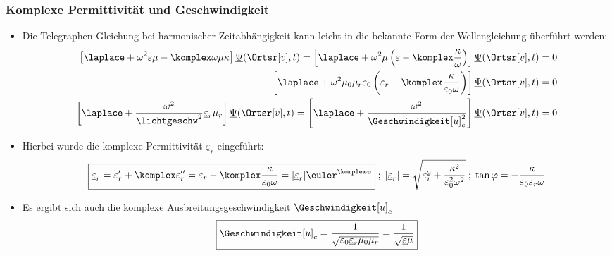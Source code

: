 \begin{frame}
  \frametitle{Komplexe Permittivität und Geschwindigkeit}
  \begin{itemize}[<+->]
  \item Die Telegraphen-Gleichung bei harmonischer Zeitabhängigkeit kann leicht in die bekannte Form der Wellengleichung überführt werden:
    \begin{align*}
      \left[ \laplace + \omega^2\varepsilon\mu - \komplex\omega\mu\kappa \right] \underline{\Psi}(\Ortsr[v], t) =\left[ \laplace + \omega^2\mu\left(\varepsilon - \komplex\frac{\kappa}{\omega}\right) \right] \underline{\Psi}(\Ortsr[v], t) &=0\\
       \left[ \laplace + \omega^2\mu_0\mu_r\varepsilon_0\left(\varepsilon_r - \komplex\frac{\kappa}{\varepsilon_0\omega}\right) \right] \underline{\Psi}(\Ortsr[v], t) &=0\\
       \left[ \laplace + \frac{\omega^2}{\lichtgeschw^2}\underline{\varepsilon}_r\mu_r\right] \underline{\Psi}(\Ortsr[v], t) = \left[ \laplace + \frac{\omega^2}{\Geschwindigkeit[u]_c^2}\right] \underline{\Psi}(\Ortsr[v], t)&=0
    \end{align*}
  \item Hierbei wurde die \alert{komplexe Permittivität} \(\underline{\varepsilon}_r\) eingeführt:
    \begin{equation*}
      \boxed{\underline{\varepsilon}_r = \varepsilon_r^{\prime} + \komplex \varepsilon_r^{\prime\prime} = \varepsilon_r - \komplex\frac{\kappa}{\varepsilon_0\omega} = |\underline{\varepsilon}_r| \euler^{\komplex\varphi}} \; ;\; |\underline{\varepsilon}_r|=\sqrt{\varepsilon_r^2+\frac{\kappa^2}{\varepsilon_0^2\omega^2}} \; ; \; \tan\varphi = -\frac{\kappa}{\varepsilon_0\varepsilon_r\omega}  
    \end{equation*}
  \item Es ergibt sich auch die \alert{komplexe Ausbreitungsgeschwindigkeit} \(\Geschwindigkeit[u]_c\)
    \begin{equation*}
    \boxed{\Geschwindigkeit[u]_c = \frac{1}{\sqrt{\varepsilon_0\underline{\varepsilon}_r\mu_0\mu_r}} = \frac{1}{\sqrt{\underline{\varepsilon}\mu}}}
    \end{equation*}
    \end{itemize}
  \end{frame}


